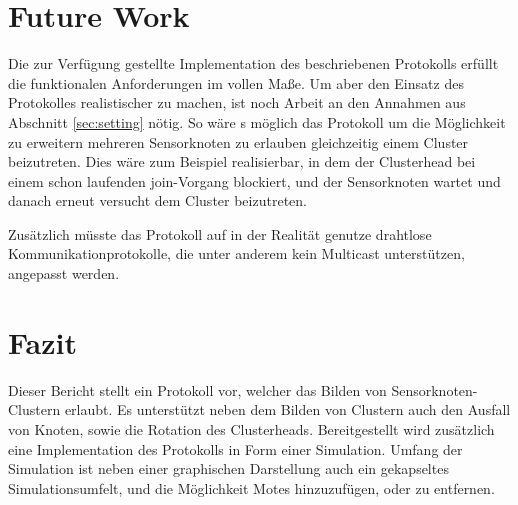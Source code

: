 \section{Future Work} \label{sec:futwork}
Die zur Verf\"ugung gestellte Implementation des beschriebenen Protokolls erf\"ullt die funktionalen Anforderungen im vollen Ma\ss e.
Um aber den Einsatz des Protokolles realistischer zu machen, ist noch Arbeit an den Annahmen aus Abschnitt \ref{sec:setting} n\"otig.
So w\"are s m\"oglich das Protokoll um die M\"oglichkeit zu erweitern mehreren Sensorknoten zu erlauben gleichzeitig einem Cluster beizutreten.
Dies w\"are zum Beispiel realisierbar, in dem der Clusterhead bei einem schon laufenden join-Vorgang blockiert, und der Sensorknoten wartet und danach erneut versucht dem Cluster beizutreten.

Zus\"atzlich m\"usste das Protokoll auf in der Realität genutze drahtlose Kommunikationprotokolle, die unter anderem kein Multicast unterst\"utzen, angepasst werden.

\section{Fazit} \label{sec:conclusion}
Dieser Bericht stellt ein Protokoll vor, welcher das Bilden von  Sensorknoten-Clustern erlaubt. Es unterst\"utzt neben dem Bilden von Clustern auch den Ausfall von Knoten, sowie die Rotation des Clusterheads.
Bereitgestellt wird zus\"atzlich eine Implementation des Protokolls in Form einer Simulation. Umfang der Simulation ist neben einer graphischen Darstellung auch ein gekapseltes Simulationsumfelt, und die Möglichkeit Motes hinzuzufügen, oder zu entfernen.
